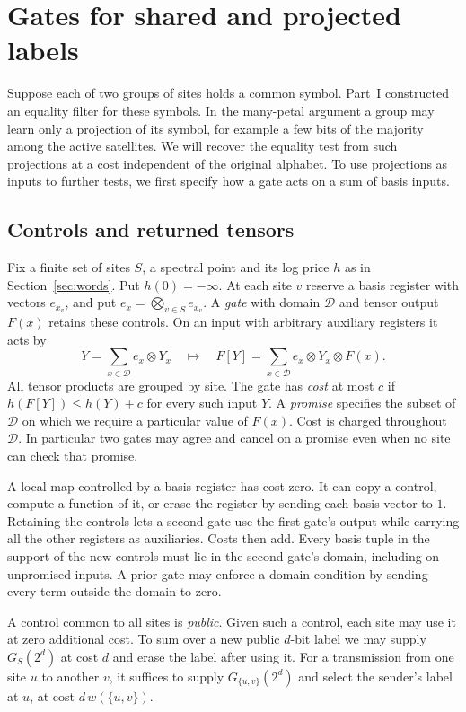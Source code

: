 \section{Gates for shared and projected labels}\label{sec:prices}

Suppose each of two groups of sites holds a common symbol. Part~I
constructed an equality filter for these symbols. In the many-petal
argument a group may learn only a projection of its symbol, for
example a few bits of the majority among the active satellites. We
will recover the equality test from such projections at a cost
independent of the original alphabet. To use projections as inputs to
further tests, we first specify how a gate acts on a sum of basis inputs.

\subsection{Controls and returned tensors}

Fix a finite set of sites \(S\), a spectral point and its log price \(h\)
as in Section~\ref{sec:words}. Put \(h(0)=-\infty\).
At each site \(v\) reserve a basis register with vectors \(e_{x_v}\),
and put \(e_x=\bigotimes_{v\in S}e_{x_v}\).
A \emph{gate} with domain \(\mathcal D\) and tensor output \(F(x)\)
retains these controls. On an input with arbitrary auxiliary registers
it acts by
\[
   Y=\sum_{x\in\mathcal D}e_x\otimes Y_x
   \quad\longmapsto\quad
   F[Y]=\sum_{x\in\mathcal D}e_x\otimes Y_x\otimes F(x).
\]
All tensor products are grouped by site. The gate has \emph{cost} at
most \(c\) if \(h(F[Y])\le h(Y)+c\) for every such input \(Y\).
A \emph{promise} specifies the subset of \(\mathcal D\) on which we
require a particular value of \(F(x)\). Cost is charged throughout
\(\mathcal D\). In particular two gates may agree and cancel on a
promise even when no site can check that promise.

A local map controlled by a basis register has cost zero. It can copy
a control, compute a function of it, or erase the register by sending
each basis vector to \(1\). Retaining the controls lets a second gate
use the first gate's output while carrying all the other registers as
auxiliaries. Costs then add. Every basis tuple in the support of the
new controls must lie in the second gate's domain, including on
unpromised inputs. A prior gate may enforce a domain condition by
sending every term outside the domain to zero.

A control common to all sites is \emph{public}. Given such a control,
each site may use it at zero additional cost. To sum over a new public
\(d\)-bit label we may supply \(G_S(2^d)\) at cost \(d\) and erase the
label after using it. For a transmission from one site \(u\) to
another \(v\), it suffices to supply \(G_{\{u,v\}}(2^d)\) and select
the sender's label at \(u\), at cost \(d\,w(\{u,v\})\).


